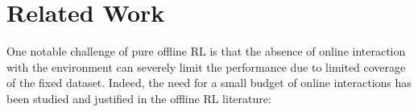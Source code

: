 \section{Related Work}



One notable challenge of pure offline RL is that the absence of online interaction with the environment can severely limit the performance due to limited coverage of the fixed dataset. 
Indeed, the need for a small budget of online interactions has been studied and justified in the offline RL literature:

